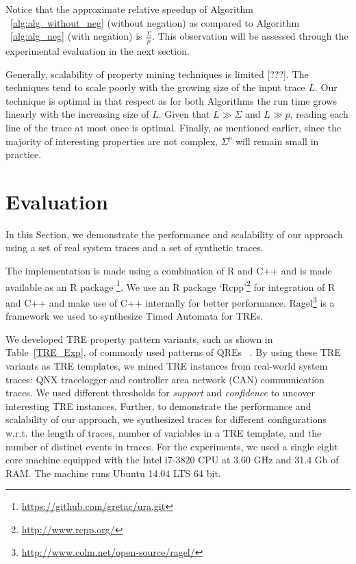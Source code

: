 \documentclass[]{sigplanconf}
\begin{document}
Notice that the approximate relative speedup of Algorithm ~\ref{alg:alg_without_neg} (without negation) as compared to Algorithm ~\ref{alg:alg_neg} (with negation) is $\frac{\Sigma}{p}$. This observation will be assessed through the experimental evaluation in the next section.


Generally, scalability of property mining techniques is limited [???].
The techniques tend to scale poorly with the growing size of the input trace $L$. Our technique is optimal in that respect as for both Algorithms the run time grows linearly with the increasing size of $L$. Given that $L \gg \Sigma$ and $L \gg p$, reading each line of the trace at most once is optimal.
Finally, as mentioned earlier, since the majority of interesting properties are not complex, $\Sigma^p$ will remain small in practice.


\section{Evaluation}

In this Section, we demonstrate the performance and scalability of our approach using a set of real system traces and a set of synthetic traces.

The implementation is made using a combination of R and C++ and is made available as an R package \footnote{\url{https://github.com/gretac/ura.git}}. We use an R package `Rcpp'\footnote{\url{http://www.rcpp.org/}} for integration of R and C++ and make use of C++ internally for better performance. Ragel\footnote{\url{http://www.colm.net/open-source/ragel/}} is a framework we used to synthesize Timed Automata for TREs.

We developed TRE property pattern variants, such as shown in Table~\ref{TRE_Exp}, of commonly used patterns of QREs ~\cite{evans1}. By using these TRE variants as TRE templates, we mined TRE instances from real-world system traces: QNX tracelogger and controller area network (CAN) communication traces. We used different thresholds for \emph{support} and \emph{confidence} to uncover interesting TRE instances. Further, to demonstrate the performance and scalability of our approach, we synthesized traces for different configurations w.r.t. the length of traces, number of variables in a TRE template, and the number of distinct events in traces. For the experiments, we used a single eight core machine equipped with the Intel i7-3820 CPU at 3.60 GHz and 31.4 Gb of RAM. The machine runs Ubuntu 14.04 LTS 64 bit.
\end{document}
